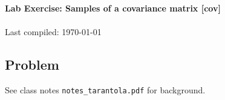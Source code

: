 \documentclass[11pt,titlepage,fleqn]{article}
\begin{document}

\begin{spacing}{1.2}
\begin{center}
{\large \bf Lab Exercise: Samples of a covariance matrix [cov]} \\
\cltag\ \\
Last compiled: \today
\end{center}
\end{spacing}


\subsection*{Problem}

See class notes \verb+notes_tarantola.pdf+ for background.
\end{document}
